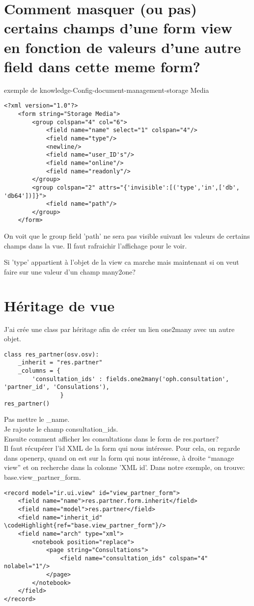 \documentclass[12pt,a4paper]{article}
\newcommand\codeHighlight[1]{\textcolor[rgb]{1,0,0}{\textbf{#1}}}
\begin{document}
 \section{Comment masquer (ou pas) certains champs d’une form view en fonction de valeurs d’une autre field dans cette meme form?}

exemple de knowledge-Config-document-management-storage Media

\begin{verbatim}
<?xml version="1.0"?>
    <form string="Storage Media">
        <group colspan="4" col="6">
            <field name="name" select="1" colspan="4"/>
            <field name="type"/>
            <newline/>
            <field name="user_ID's"/>
            <field name="online"/>
            <field name="readonly"/>
        </group>
        <group colspan="2" attrs="{'invisible':[('type','in',['db', 'db64'])]}">
            <field name="path"/>
        </group>
    </form>
\end{verbatim}



On voit que le group field ’path’ ne sera pas visible suivant les valeurs de certains champs dans la vue. Il faut rafraichir l’affichage
pour le voir.

Si 'type' appartient à l'objet de la view ca marche mais maintenant si on veut faire sur une valeur d'un champ many2one?
\section{Héritage de vue}
\label{sec:view_inherit}

J'ai crée une class par héritage afin de créer un lien one2many avec un autre objet.
\begin{verbatim}
class res_partner(osv.osv):
    _inherit = "res.partner"
    _columns = {
        'consultation_ids' : fields.one2many('oph.consultation', 'partner_id', 'Consulations'),
                }
res_partner()
\end{verbatim}
Pas mettre le \_name.\\
Je rajoute le champ consultation\_ids.\\
Ensuite comment afficher les consultations dans le form de res.partner?\\
Il faut récupérer l'id XML de la form qui nous intéresse. Pour cela, on regarde dans openerp, quand on est sur la form qui nous intéresse, à droite ``manage view'' et on recherche dans la colonne 'XML id'. Dans notre exemple, on trouve: base.view\_partner\_form.
\begin{Verbatim}[commandchars=\\\{\}]
<record model="ir.ui.view" id="view_partner_form">
    <field name="name">res.partner.form.inherit</field>
    <field name="model">res.partner</field>
    <field name="inherit_id" \codeHighlight{ref="base.view_partner_form"}/>
    <field name="arch" type="xml">
        <notebook position="replace">
            <page string="Consultations">
                <field name="consultation_ids" colspan="4" nolabel="1"/>
            </page>
        </notebook>
    </field>
</record>
\end{Verbatim}
\end{document}
